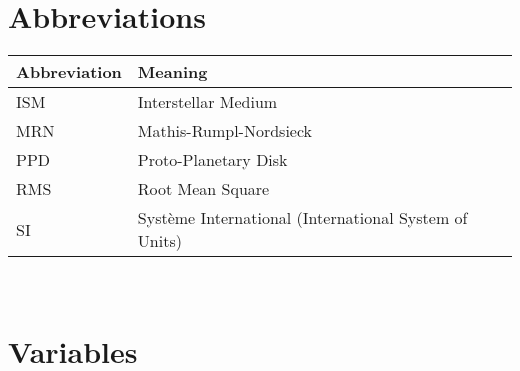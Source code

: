 \section{Abbreviations}

    \begin{table}[h!]
        \begin{tabular}{|l|l|}
            \hline
            \textbf{Abbreviation}   & \textbf{Meaning} \\
            \hline
            ISM                     & Interstellar Medium \\
            \hline
            MRN                     & Mathis-Rumpl-Nordsieck \\
            \hline
            PPD                     & Proto-Planetary Disk \\
            \hline
            RMS                     & Root Mean Square \\
            \hline
            SI                      & Système International (International System of Units) \\
            \hline                  %
        \end{tabular}
    \end{table} \ \\ 

\section{Variables}

